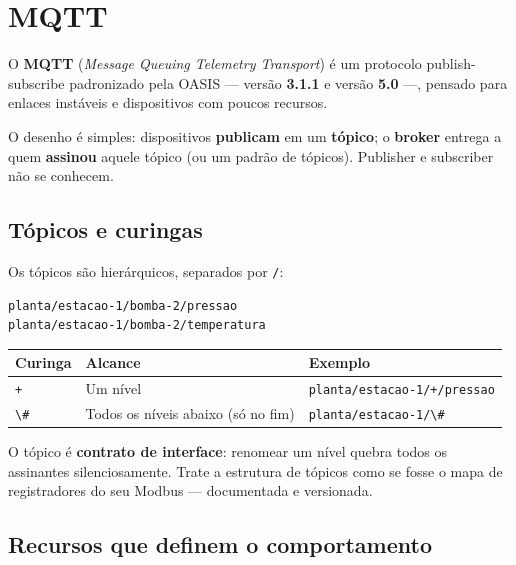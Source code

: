 \section{MQTT}\label{mqtt}

O \textbf{MQTT} (\emph{Message Queuing Telemetry Transport}) é um protocolo publish-subscribe padronizado pela OASIS --- versão \textbf{3.1.1} e versão \textbf{5.0} ---, pensado para enlaces instáveis e dispositivos com poucos recursos.

O desenho é simples: dispositivos \textbf{publicam} em um \textbf{tópico}; o \textbf{broker} entrega a quem \textbf{assinou} aquele tópico (ou um padrão de tópicos). Publisher e subscriber não se conhecem.

\subsection{Tópicos e curingas}\label{tuxf3picos-e-curingas}

Os tópicos são hierárquicos, separados por \passthrough{\lstinline!/!}:

\begin{lstlisting}
planta/estacao-1/bomba-2/pressao
planta/estacao-1/bomba-2/temperatura
\end{lstlisting}

\begin{longtable}[]{@{}lll@{}}
\toprule\noalign{}
Curinga & Alcance & Exemplo \\
\midrule\noalign{}
\endhead
\bottomrule\noalign{}
\endlastfoot
\passthrough{\lstinline!+!} & Um nível & \passthrough{\lstinline!planta/estacao-1/+/pressao!} \\
\passthrough{\lstinline!\#!} & Todos os níveis abaixo (só no fim) & \passthrough{\lstinline!planta/estacao-1/\#!} \\
\end{longtable}

O tópico é \textbf{contrato de interface}: renomear um nível quebra todos os assinantes silenciosamente. Trate a estrutura de tópicos como se fosse o mapa de registradores do seu Modbus --- documentada e versionada.

\subsection{Recursos que definem o comportamento}\label{recursos-que-definem-o-comportamento}


